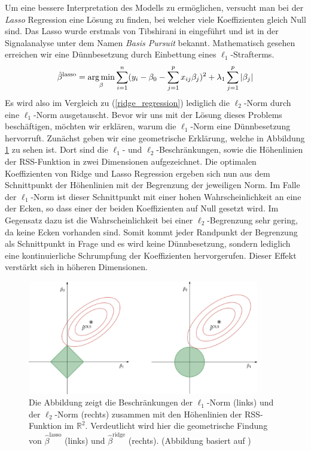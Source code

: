Um eine bessere Interpretation des Modells zu ermöglichen, versucht man bei der \textit{Lasso} Regression eine Lösung zu finden, bei welcher viele Koeffizienten gleich Null sind. Das Lasso wurde erstmals von Tibshirani in \cite{tibshirani_lasso} eingeführt und ist in der Signalanalyse unter dem Namen \textit{Basis Pursuit} \cite{chen} bekannt. Mathematisch gesehen erreichen wir eine Dünnbesetzung durch Einbettung eines $\ell_1$-Strafterms.
\begin{align}
\label{lasso_formulation}
\hat{\beta}^{\text{lasso}} = \operatorname*{arg\,min}_{\beta} \sum_{i=1}^{n}(y_i - \beta_0 - \sum_{j=1}^p x_{ij}\beta_j)^2 + \lambda_1\sum_{j=1}^p \left|\beta_j\right|
\end{align}
Es wird also im Vergleich zu (\ref{ridge_regression}) lediglich die $\ell_2$-Norm durch eine $\ell_1$-Norm ausgetauscht. Bevor wir uns mit der Lösung dieses Problems beschäftigen, möchten wir erklären, warum die $\ell_1$-Norm eine Dünnbesetzung hervorruft. Zunächst geben wir eine geometrische Erklärung, welche in Abbildung \ref{lasso_ridge_regression_figure} zu sehen ist. Dort sind die $\ell_1$- und $\ell_2$-Beschränkungen, sowie die Höhenlinien der RSS-Funktion in zwei Dimensionen aufgezeichnet. Die optimalen Koeffizienten von Ridge und Lasso Regression ergeben sich nun aus dem Schnittpunkt der Höhenlinien mit der Begrenzung der jeweiligen Norm. Im Falle der $\ell_1$-Norm ist dieser Schnittpunkt mit einer hohen Wahrscheinlichkeit an eine der Ecken, so dass einer der beiden Koeffizienten auf Null gesetzt wird. Im Gegensatz dazu ist die Wahrscheinlichkeit bei einer $\ell_2$-Begrenzung sehr gering, da keine Ecken vorhanden sind. Somit kommt jeder Randpunkt der Begrenzung als Schnittpunkt in Frage und es wird keine Dünnbesetzung, sondern lediglich eine kontinuierliche Schrumpfung der Koeffizienten hervorgerufen. Dieser Effekt verstärkt sich in höheren Dimensionen.

\begin{figure}
\centering
\includegraphics[width = 0.9\textwidth]{figures/lasso_ridge_regression.jpg}
\caption{Die Abbildung zeigt die Beschränkungen der $\ell_1$-Norm (links) und der $\ell_2$-Norm (rechts) zusammen mit den Höhenlinien der RSS-Funktion im $\mathbb{R}^2$. Verdeutlicht wird hier die geometrische Findung von $\hat{\beta}^{\text{lasso}}$ (links) und $\hat{\beta}^{\text{ridge}}$ (rechts). (Abbildung basiert auf \cite{hastie_elements})}
\label{lasso_ridge_regression_figure}
\end{figure}

